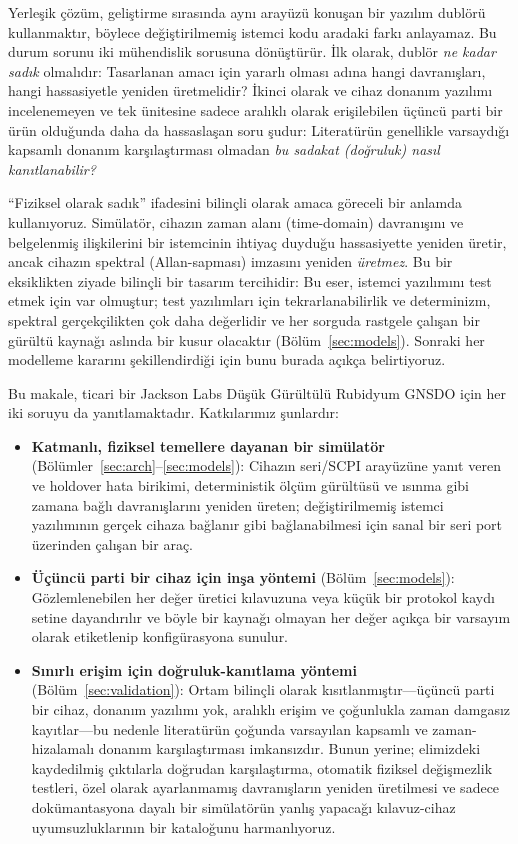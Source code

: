 \documentclass[9pt,twocolumn,a4paper]{extarticle}
\begin{document}
Yerleşik çözüm, geliştirme sırasında aynı arayüzü konuşan bir yazılım dublörü kullanmaktır, böylece değiştirilmemiş istemci kodu aradaki farkı anlayamaz. Bu durum sorunu iki mühendislik sorusuna dönüştürür. İlk olarak, dublör \emph{ne kadar sadık} olmalıdır: Tasarlanan amacı için yararlı olması adına hangi davranışları, hangi hassasiyetle yeniden üretmelidir? İkinci olarak ve cihaz donanım yazılımı incelenemeyen ve tek ünitesine sadece aralıklı olarak erişilebilen üçüncü parti bir ürün olduğunda daha da hassaslaşan soru şudur: Literatürün genellikle varsaydığı kapsamlı donanım karşılaştırması olmadan \emph{bu sadakat (doğruluk) nasıl kanıtlanabilir?}

``Fiziksel olarak sadık'' ifadesini bilinçli olarak amaca göreceli bir anlamda kullanıyoruz. Simülatör, cihazın zaman alanı (time-domain) davranışını ve belgelenmiş ilişkilerini bir istemcinin ihtiyaç duyduğu hassasiyette yeniden üretir, ancak cihazın spektral (Allan-sapması) imzasını yeniden \emph{üretmez}. Bu bir eksiklikten ziyade bilinçli bir tasarım tercihidir: Bu eser, istemci yazılımını test etmek için var olmuştur; test yazılımları için tekrarlanabilirlik ve determinizm, spektral gerçekçilikten çok daha değerlidir ve her sorguda rastgele çalışan bir gürültü kaynağı aslında bir kusur olacaktır (Bölüm~\ref{sec:models}). Sonraki her modelleme kararını şekillendirdiği için bunu burada açıkça belirtiyoruz.

Bu makale, ticari bir Jackson Labs Düşük Gürültülü Rubidyum GNSDO için her iki soruyu da yanıtlamaktadır. Katkılarımız şunlardır:
\begin{itemize}
\item \textbf{Katmanlı, fiziksel temellere dayanan bir simülatör} (Bölümler~\ref{sec:arch}--\ref{sec:models}): Cihazın seri/SCPI arayüzüne yanıt veren ve holdover hata birikimi, deterministik ölçüm gürültüsü ve ısınma gibi zamana bağlı davranışlarını yeniden üreten; değiştirilmemiş istemci yazılımının gerçek cihaza bağlanır gibi bağlanabilmesi için sanal bir seri port üzerinden çalışan bir araç.
\item \textbf{Üçüncü parti bir cihaz için inşa yöntemi} (Bölüm~\ref{sec:models}): Gözlemlenebilen her değer üretici kılavuzuna veya küçük bir protokol kaydı setine dayandırılır ve böyle bir kaynağı olmayan her değer açıkça bir varsayım olarak etiketlenip konfigürasyona sunulur.
\item \textbf{Sınırlı erişim için doğruluk-kanıtlama yöntemi} (Bölüm~\ref{sec:validation}): Ortam bilinçli olarak kısıtlanmıştır---üçüncü parti bir cihaz, donanım yazılımı yok, aralıklı erişim ve çoğunlukla zaman damgasız kayıtlar---bu nedenle literatürün çoğunda varsayılan kapsamlı ve zaman-hizalamalı donanım karşılaştırması imkansızdır. Bunun yerine; elimizdeki kaydedilmiş çıktılarla doğrudan karşılaştırma, otomatik fiziksel değişmezlik testleri, özel olarak ayarlanmamış davranışların yeniden üretilmesi ve sadece dokümantasyona dayalı bir simülatörün yanlış yapacağı kılavuz-cihaz uyumsuzluklarının bir kataloğunu harmanlıyoruz.
\end{itemize}
\end{document}
